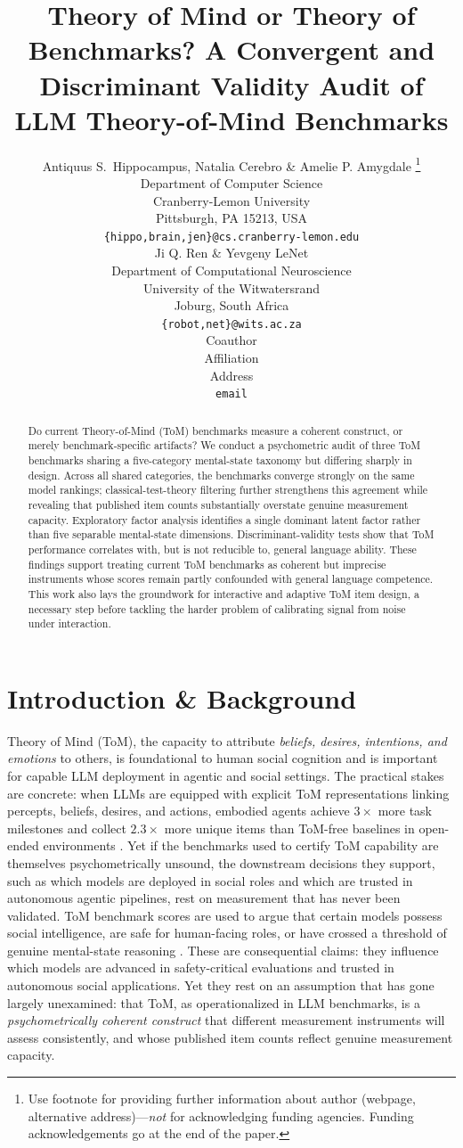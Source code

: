 \documentclass{article} %
\title{Theory of Mind or Theory of Benchmarks? A Convergent and Discriminant Validity Audit of LLM Theory-of-Mind Benchmarks}
\author{Antiquus S.~Hippocampus, Natalia Cerebro \& Amelie P. Amygdale \thanks{ Use footnote for providing further information
about author (webpage, alternative address)---\emph{not} for acknowledging
funding agencies.  Funding acknowledgements go at the end of the paper.} \\
Department of Computer Science\\
Cranberry-Lemon University\\
Pittsburgh, PA 15213, USA \\
\texttt{\{hippo,brain,jen\}@cs.cranberry-lemon.edu} \\
\And
Ji Q. Ren \& Yevgeny LeNet \\
Department of Computational Neuroscience \\
University of the Witwatersrand \\
Joburg, South Africa \\
\texttt{\{robot,net\}@wits.ac.za} \\
\AND
Coauthor \\
Affiliation \\
Address \\
\texttt{email}
}
\begin{document}
\ifcolmsubmission
\linenumbers
\fi

\maketitle

\begin{abstract}
Do current Theory-of-Mind (ToM) benchmarks measure a coherent construct, or merely benchmark-specific artifacts? We conduct a psychometric audit of three ToM benchmarks sharing a five-category mental-state taxonomy but differing sharply in design. Across all shared categories, the benchmarks converge strongly on the same model rankings; classical-test-theory filtering further strengthens this agreement while revealing that published item counts substantially overstate genuine measurement capacity. Exploratory factor analysis identifies a single dominant latent factor rather than five separable mental-state dimensions. Discriminant-validity tests show that ToM performance correlates with, but is not reducible to, general language ability. These findings support treating current ToM benchmarks as coherent but imprecise instruments whose scores remain partly confounded with general language competence. This work also lays the groundwork for interactive and adaptive ToM item design, a necessary step before tackling the harder problem of calibrating signal from noise under interaction.
\end{abstract}
 
\section{Introduction \& Background}
\label{sec:intro}
 
Theory of Mind (ToM), the capacity to attribute \textit{beliefs, desires,
intentions, and emotions} to others, is foundational to human social
cognition \citep{beaudoin2020atoms} and is important for
capable LLM deployment in agentic and social settings.
The practical stakes are concrete: when LLMs are equipped with explicit
ToM representations linking percepts, beliefs, desires, and actions,
embodied agents achieve $3\times$ more task milestones and collect
$2.3\times$ more unique items than ToM-free baselines in open-ended
environments \citep{licua2026mindforge}.
Yet if the benchmarks used to certify ToM capability are themselves
psychometrically unsound, the downstream decisions they support, such as which models are deployed in social roles and which are trusted in
autonomous agentic pipelines, rest on measurement that has never
been validated.
ToM benchmark scores are used to argue that certain models possess
social intelligence, are safe for human-facing roles, or have crossed a
threshold of genuine mental-state reasoning
\citep{kosinski2024evaluating, chen2024tombench}.
These are consequential claims: they influence which models are advanced
in safety-critical evaluations and trusted in autonomous social
applications. Yet they rest on an assumption that has gone largely
unexamined: that ToM, as operationalized in LLM benchmarks, is a
\textit{psychometrically coherent construct} that different
measurement instruments will assess consistently, and whose published
item counts reflect genuine measurement capacity.
 
\end{document}
